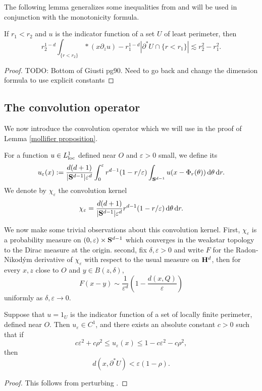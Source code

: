 The following lemma generalizes some inequalities from \cite[pg90]{Giusti77} and will be used in conjunction with the monotonicity formula.

\begin{lemma}\label{scalar curvature monotonicity}
If $r_1 < r_2$ and $u$ is the indicator function of a set $U$ of least perimeter, then
$$r_2^{1 - d}\int_{\{r < r_2\}} *(x\partial_z u) - r_1^{1 - d}|\partial^* U \cap \{r < r_1\}| \lesssim r_2^2 - r_1^2.$$
\end{lemma}
\begin{proof}
TODO: Bottom of Giusti pg90. Need to go back and change the dimension formula to use explicit constants
\end{proof}

\subsection{The convolution operator}
We now introduce the convolution operator which we will use in the proof of Lemma \ref{mollifier proposition}.

\begin{definition}
For a function $u \in L^1_{\mathrm{loc}}$ defined near $O$ and $\varepsilon > 0$ small, we define its 
$$u_\varepsilon(x) := \frac{d(d + 1)}{|\mathbf S^{d - 1}| \varepsilon^d} \int_0^\varepsilon r^{d - 1}(1 - r/\varepsilon) \int_{\mathbf S^{d - 1}} u(x - \Phi_r(\theta)) \mathop{}\!\mathrm{d} \theta \mathop{}\!\mathrm{d} r.$$
We denote by $\chi_\varepsilon$ the convolution kernel 
$$\chi_\varepsilon = \frac{d(d + 1)}{|\mathbf S^{d - 1}| \varepsilon^d}r^{d - 1}(1 - r/\varepsilon) \mathop{}\!\mathrm{d} \theta \mathop{}\!\mathrm{d} r.$$
\end{definition}

We now make some trivial observations about this convolution kernel. First, $\chi_\varepsilon$ is a probability measure on $(0, \varepsilon) \times \mathbf S^{d - 1}$ which converges in the weakstar topology to the Dirac measure at the origin.
second, fix $\delta, \varepsilon > 0$ and write $F$ for the Radon-Nikod\'ym derivative of $\chi_\varepsilon$ with respect to the usual measure on $\mathbf H^d$, then for every $x, z$ close to $O$ and $y \in B(z, \delta)$,
\begin{equation}\label{approximation of mollifier 2}
F(x - y) \sim \frac{1}{\varepsilon^d}\left(1 - \frac{d(x, Q)}{\varepsilon}\right)
\end{equation}
uniformly as $\delta, \varepsilon \to 0$.

\begin{lemma}\label{Giusti71}
Suppose that $u = 1_U$ is the indicator function of a set of locally finite perimeter, defined near $O$. Then $u_\varepsilon \in C^1$, and there exists an absolute constant $c > 0$ such that if
$$c\varepsilon^2 + c\rho^2 \leq u_\varepsilon(x) \leq 1 - c\varepsilon^2 - c\rho^2,$$
then
\begin{equation}\label{Giusti71 claim}
d(x, \partial^* U) < \varepsilon(1 - \rho).
\end{equation}
\end{lemma}
\begin{proof}
This follows from perturbing \cite[Lemma 7.1]{Giusti77}.
\end{proof}

